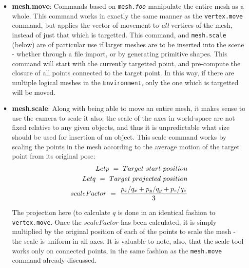 \documentclass[a4paper,10pt]{article}
\begin{document}
\begin{itemize}
\item{\textbf{mesh.move}: Commands based on \texttt{mesh.\textit{foo}} manipulate the entire mesh as a whole. This command works in exactly the same manner as the \texttt{vertex.move} command, but applies the vector of movement to \textit{all} vertices of the mesh, instead of just that which is targetted. This command, and \texttt{mesh.scale} (below) are of particular use if larger meshes are to be inserted into the scene - whether through a file import, or by generating primitive shapes. This command will start with the currently targetted point, and pre-compute the closure of all points connected to the target point. In this way, if there are multiple logical meshes in the \texttt{Environment}, only the one which is targetted will be moved.}

\item{\textbf{mesh.scale}: Along with being able to move an entire mesh, it makes sense to use the camera to scale it also; the scale of the axes in world-space are not fixed relative to any given objects, and thus it is unpredictable what size should be used for insertion of an object. This scale command works by scaling the points in the mesh according to the average motion of the target point from its original pose:
\begin{eqnarray*}
  Let p ~=~ Target~start~position \\
  Let q ~=~ Target~projected~position \\
  scaleFactor ~=~ {p_x / q_x + p_y / q_y + p_z / q_z \over 3}  
\end{eqnarray*}

The projection here (to calculate $q$ is done in an identical fashion to \texttt{vertex.move}. Once the $scaleFactor$ has been calculated, it is simply multiplied by the original position of each of the points to scale the mesh - the scale is uniform in all axes. It is valuable to note, also, that the scale tool works only on connected points, in the same fashion as the \texttt{mesh.move} command already discussed.}


\end{itemize}
\end{document}
